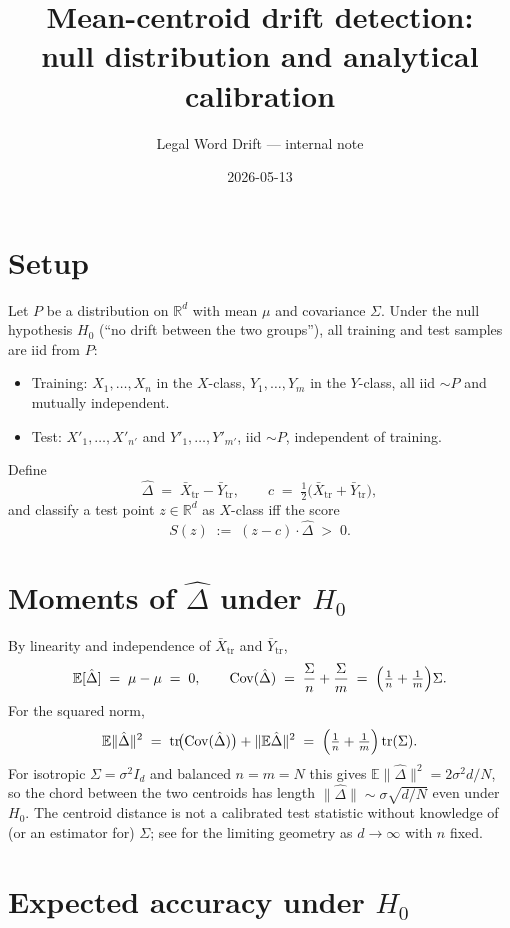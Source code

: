 \documentclass[11pt]{article}
\title{Mean-centroid drift detection:\\
null distribution and analytical calibration}
\author{Legal Word Drift — internal note}
\date{2026-05-13}
\newcommand{\E}{\mathbb{E}}
\newcommand{\Cov}{\operatorname{Cov}}
\newcommand{\tr}{\operatorname{tr}}
\newcommand{\R}{\mathbb{R}}
\newcommand{\1}{\mathbf{1}}
\begin{document}
\maketitle

\section{Setup}

Let $P$ be a distribution on $\R^d$ with mean $\mu$ and covariance $\Sigma$.
Under the null hypothesis $H_0$ (``no drift between the two groups''), all
training and test samples are iid from $P$:
\begin{itemize}
  \item Training: $X_1,\dots,X_n$ in the $X$-class, $Y_1,\dots,Y_m$ in the
        $Y$-class, all iid $\sim P$ and mutually independent.
  \item Test: $X'_1,\dots,X'_{n'}$ and $Y'_1,\dots,Y'_{m'}$, iid $\sim P$,
        independent of training.
\end{itemize}
Define
\[
  \hat\Delta \;=\; \bar X_{\mathrm{tr}} - \bar Y_{\mathrm{tr}},
  \qquad
  c \;=\; \tfrac{1}{2}\bigl(\bar X_{\mathrm{tr}} + \bar Y_{\mathrm{tr}}\bigr),
\]
and classify a test point $z \in \R^d$ as $X$-class iff the score
\[
  S(z) \;:=\; (z - c)\cdot\hat\Delta \;>\; 0.
\]

\section{Moments of \texorpdfstring{$\hat\Delta$}{Delta} under \texorpdfstring{$H_0$}{H0}}

By linearity and independence of $\bar X_{\mathrm{tr}}$ and $\bar Y_{\mathrm{tr}}$,
\[
  \E[\hat\Delta] \;=\; \mu - \mu \;=\; 0,
  \qquad
  \Cov(\hat\Delta) \;=\; \frac{\Sigma}{n} + \frac{\Sigma}{m}
  \;=\; \Bigl(\tfrac{1}{n} + \tfrac{1}{m}\Bigr)\Sigma.
\]
For the squared norm,
\[
  \E\|\hat\Delta\|^2
  \;=\; \tr\!\bigl(\Cov(\hat\Delta)\bigr) + \|\E\hat\Delta\|^2
  \;=\; \Bigl(\tfrac{1}{n} + \tfrac{1}{m}\Bigr)\tr(\Sigma).
\]
For isotropic $\Sigma = \sigma^2 I_d$ and balanced $n = m = N$ this gives
$\E\|\hat\Delta\|^2 = 2\sigma^2 d / N$, so the chord between the two
centroids has length $\|\hat\Delta\| \sim \sigma\sqrt{d/N}$ even under
$H_0$. The centroid distance is not a calibrated test statistic without
knowledge of (or an estimator for) $\Sigma$; see \cite{HallMarronNeeman2005}
for the limiting geometry as $d \to \infty$ with $n$ fixed.

\section{Expected accuracy under \texorpdfstring{$H_0$}{H0}}
\end{document}
